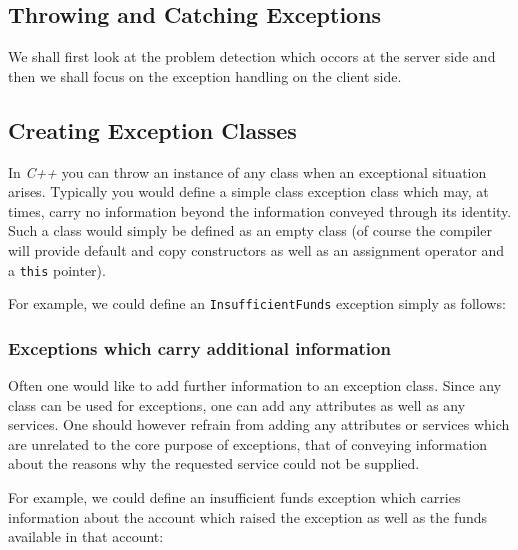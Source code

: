
\subsection{Throwing and Catching Exceptions}

We shall first look at the problem detection which occors at the server side
and then we shall focus on the exception handling on the client side.


\subsection{Creating Exception Classes}

In {\em C++} you can throw an instance of any class when an exceptional 
situation arises. Typically you would define a simple class exception class
which may, at times, carry no information beyond the information conveyed 
through its identity. Such a class would simply be defined as an empty class
(of course the compiler will provide default and copy constructors as well as 
an assignment operator and a \verb+this+ pointer).

For example, we could define an \verb+InsufficientFunds+ exception 
simply as follows:



\subsubsection{Exceptions which carry additional information}

Often one would like to add further information to an exception class.
Since any class can be used for exceptions, one can add any attributes
as well as any services. One should however refrain from adding any
attributes  or services which are unrelated to the core purpose of 
exceptions, that of conveying information about the reasons why the
requested service could not be supplied.

For example, we could define an insufficient funds exception which
carries information about the account which raised the exception as
well as the funds available in that account:

